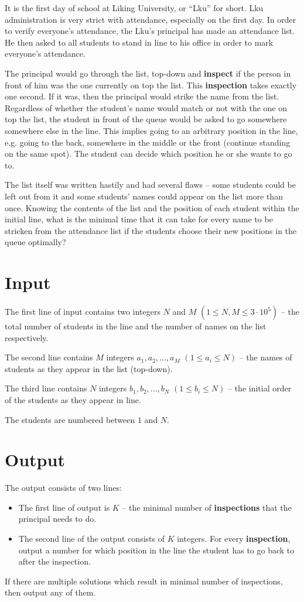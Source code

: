 It is the first day of school at Liking University, or ``Lku'' for short.
Lku administration is very strict with attendance, especially on the first day.
In order to verify everyone's attendance, the Lku's principal has made an attendance list.
He then asked to all students to stand in line to his office in order to mark everyone's attendance.

The principal would go through the list, top-down and \textbf{inspect} if the person in front of him was the one currently on top the list.
This \textbf{inspection} takes exactly one second.
If it was, then the principal would strike the name from the list.
Regardless of whether the student's name would match or not with the one on top the list, the student in front of the queue would be asked to go somewhere somewhere else in the line.
This implies going to an arbitrary position in the line, e.g. going to the back, somewhere in the middle or the front (continue standing on the same spot).
The student can decide which position he or she wants to go to.

The list itself was written hastily and had several flaws -- some students could be left out from it and some students' names could appear on the list more than once.
Knowing the contents of the list and the position of each student within the initial line, what is the minimal time that it can take for every name to be stricken from the attendance list if the students choose their new positions in the queue optimally?

\section*{Input}
The first line of input contains two integers $N$ and $M$ $(1 \leq N, M \leq 3 \cdot 10^5)$ -- the total number of students in the line and the number of names on the list respectively.

The second line contains $M$ integers $a_1, a_2, ... , a_M$ $(1 \leq a_i \leq N)$ -- the names of students as they appear in the list (top-down).

The third line contains $N$ integers $b_1, b_2, ... , b_N$ $(1 \leq b_i \leq N)$ -- the initial order of the students as they appear in line.

The students are numbered between $1$ and $N$.

\section*{Output}
The output consists of two lines:

\begin{itemize}
\item The first line of output is $K$ -- the minimal number of \textbf{inspections} that the principal needs to do.
\item The second line of the output consists of $K$ integers. For every \textbf{inspection}, output a number for which position in the line the student has to go back to after the inspection.
\end{itemize}

If there are multiple solutions which result in minimal number of inspections, then output any of them.

